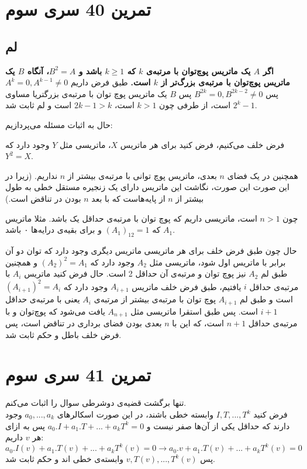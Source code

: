 \documentclass[12pt,a4paper]{article}
\begin{document}
\section{تمرین 40 سری سوم}
\subsection{لم}
\textbf{
اگر $A$ یک ماتریس پوچ‌توان با مرتبه‌ی $k$ 
که
$k \geq 1$
باشد و $B^2 = A$، آنگاه $B$ یک ماتریس پوچ‌توان با مرتبه‌ی بزرگ‌تر از 
$k$
است.
}
طبق فرض داریم 
$A^k = 0, A^{k-1} \neq 0$
پس 
$B^{2k} = 0, B^{2k-2} \neq 0$
پس $B$ یک ماتریس پوچ توان با مرتبه‌ی بزرگتریا مساوی 
$2^k-1$
است، از طرفی چون $k > 1$ است، 
$2k-1 > k$
است و لم ثابت شد.

حال به اثبات مسئله می‌پردازیم:

فرض خلف می‌کنیم، فرض کنید برای هر ماتریس $X$، ماتریسی مثل $Y$ وجود دارد که 
$Y^2 = X$.

همچنین در یک فضای $n$ بعدی، ماتریس پوچ توانی با مرتبه‌ی بیشتر از $n$ نداریم. (زیرا در این صورت این صورت، نگاشت این ماتریس دارای یک زنجیره مستقل خطی به طول بیشتر از $n$ از پایه‌هاست که با بعد $n$ بودن در تناقض است.)

چون $n>1$ است، ماتریسی داریم که پوچ توان با مرتبه‌ی حداقل یک باشد. مثلا ماتریس 
$A_1$
 که 
$(A_1)_{12} = 1$
 و برای بقیه‌ی درایه‌ها ۰ باشد.

حال چون طبق فرض خلف برای هر ماتریسی ماتریس دیگری وجود دارد که توان دو آن برابر با ماتریس اول شود، ماتریسی مثل $A_2$ وجود دارد که 
$(A_2)^2 = A_1$
و همچنین طبق لم $A_2$ نیز پوچ توان و مرتبه‌ی آن حداقل 2 است. حال فرض کنید ماتریس $A_i$ با مرتبه‌ی حداقل $i$ یافتیم، طبق فرض خلف ماتریس 
$A_{i+1}$
وجود دارد که
$(A_{i+1})^2 = A_i$
است و طبق لم $A_{i+1}$ پوچ توان با مرتبه‌ی بیشتر از مرتبه‌ی $A_i$ یعنی با مرتبه‌ی حداقل $i+1$ است. پس طبق استقرا ماتریسی مثل $A_{n+1}$ یافت می‌شود که پوچ‌توان و با مرتبه‌ی حداقل $n+1$ است، که این با $n$ بعدی بودن فضای برداری در تناقض است، پس فرض خلف باطل و حکم ثابت شد.
\section{تمرین 41 سری سوم}
تنها برگشت قضیه‌ی دوشرطی سوال را اثبات می‌کنم.
\\
فرض کنید $I, T, ..., T^k$ وابسته خطی باشند، در این صورت اسکالرهای
$a_0, ..., a_k$
وجود دارند که حداقل یکی از آن‌ها صفر نیست و 
$a_0.I + a_1.T + ... + a_k T^k = 0$
پس به ازای هر $v$ داریم:
$$a_0.I(v) + a_1.T(v) + ... + a_k T^k(v) = 0 \rightarrow a_0.v + a_1.T(v) + ... + a_k T^k(v) = 0$$
پس
$v, T(v), ..., T^k(v)$
وابسته‌ی خطی اند و حکم ثابت شد.
\end{document}
